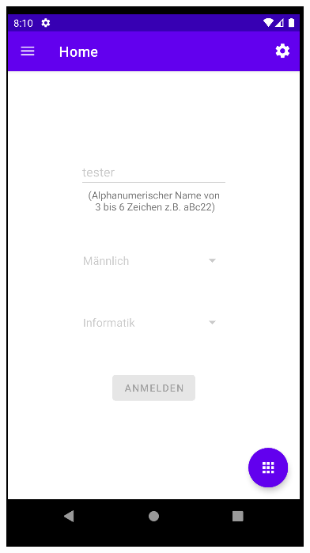 \documentclass[ngerman]{tutorial}
\begin{document}
\begin{center}
    \includegraphics[scale=0.45]{reg_fail.png}
\end{center}



\newpage
\end{document}
